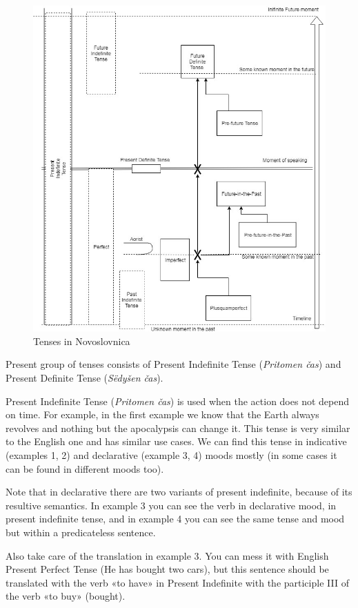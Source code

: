 \begin{figure}
	\includegraphics[width=\linewidth]{./sources/tenses.jpg}
	\caption{Tenses in Novoslovnica}
	\label{fig:tenses}
\end{figure}

Present group of tenses consists of Present Indefinite Tense (\textit{Pritomen čas}) and Present Definite Tense (\textit{Sëdyšen čas}).

Present Indefinite Tense (\textit{Pritomen čas}) is used when the action does not depend on time. For example, in the first example we know that the Earth always revolves and nothing but the apocalypsis can change it. This tense is very similar to the English one and has similar use cases. We can find this tense in indicative (examples 1, 2) and declarative (example 3, 4) moods mostly (in some cases it can be found in different moods too).

Note that in declarative there are two variants of present indefinite, because of its resultive semantics. In example 3 you can see the verb in declarative mood, in present indefinite tense, and in example 4 you can see the same tense and mood but within a predicateless sentence.

Also take care of the translation in example 3. You can mess it with English Present Perfect Tense (He has bought two cars), but this sentence should be translated with the verb «to have» in Present Indefinite with the participle III of the verb «to buy» (bought).

